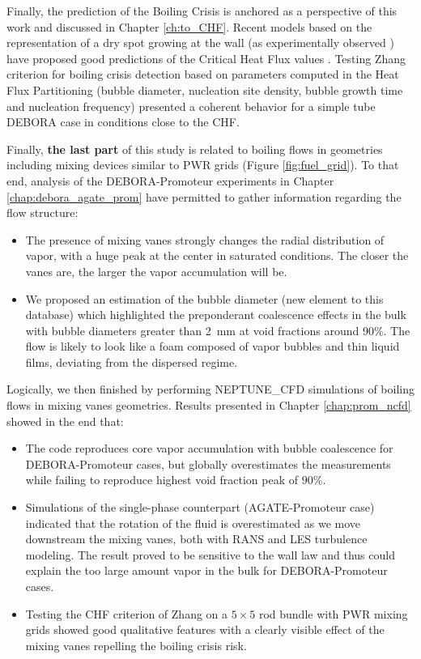 Finally, the prediction of the Boiling Crisis is anchored as a perspective of this work and discussed in Chapter \ref{ch:to_CHF}. Recent models based on the representation of a dry spot growing at the wall (as experimentally observed \cite{kossolapov_experimental_2021, richenderfer_experimental_2018}) have proposed good predictions of the Critical Heat Flux values \cite{zhang_new_2022, demarly_new_2020}. Testing Zhang criterion for boiling crisis detection \cite{zhang_new_2022} based on parameters computed in the Heat Flux Partitioning (bubble diameter, nucleation site density, bubble growth time and nucleation frequency) presented a coherent behavior for a simple tube DEBORA case in conditions close to the CHF.

\npar

Finally, \textbf{the last part} of this study is related to boiling flows in geometries including mixing devices similar to PWR grids (Figure \ref{fig:fuel_grid}). To that end, analysis of the DEBORA-Promoteur experiments in Chapter \ref{chap:debora_agate_prom} have permitted to gather information regarding the flow structure:

\begin{itemize}
\item The presence of mixing vanes strongly changes the radial distribution of vapor, with a huge peak at the center in saturated conditions. The closer the vanes are, the larger the vapor accumulation will be.
\item We proposed an estimation of the bubble diameter (new element to this database) which highlighted the preponderant coalescence effects in the bulk with bubble diameters greater than 2\ mm at void fractions around 90\%. The flow is likely to look like a foam composed of vapor bubbles and thin liquid films, deviating from the dispersed regime. 
\end{itemize}

Logically, we then finished by performing NEPTUNE\_CFD simulations of boiling flows in mixing vanes geometries. Results presented in Chapter \ref{chap:prom_ncfd} showed in the end that:

\begin{itemize}
\item The code reproduces core vapor accumulation with bubble coalescence for DEBORA-Promoteur cases, but globally overestimates the measurements while failing to reproduce highest void fraction peak of $90\%$.
\item Simulations of the single-phase counterpart (AGATE-Promoteur case) indicated that the rotation of the fluid is overestimated as we move downstream the mixing vanes, both with RANS and LES turbulence modeling. The result proved to be sensitive to the wall law and thus could explain the too large amount vapor in the bulk for DEBORA-Promoteur cases.
\item Testing the CHF criterion of Zhang \cite{zhang_new_2022} on a $5 \times 5$ rod bundle with PWR mixing grids showed good qualitative features with a clearly visible effect of the mixing vanes repelling the boiling crisis risk.
\end{itemize}

